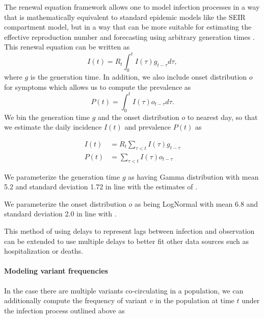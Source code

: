 \documentclass[12pt]{article}
\begin{document}
The renewal equation framework allows one to model infection processes in a way that is mathematically equivalent to standard epidemic models like the SEIR compartment model, but in a way that can be more suitable for estimating the effective reproduction number and forecasting using arbitrary generation times \cite{Champredon2018}. This renewal equation can be written as
\begin{equation}
  I(t) = R_{t} \int_{0}^{t} I(\tau)g_{t-\tau} d\tau,
\end{equation}
where $g$ is the generation time.
In addition, we also include onset distribution $o$ for symptoms which allows us to compute the prevalence as
\begin{equation}
  P(t) = \int_{0}^{t} I(\tau) o_{t-\tau} d \tau.
\end{equation}
We bin the generation time $g$ and the onset distribution $o$ to nearest day, so that we estimate the daily incidence $I(t)$ and prevalence $P(t)$ as

\begin{align}
  I(t) &= R_{t} \sum_{\tau < t} I(\tau) g_{t-\tau}\\
  P(t) &= \sum_{\tau < t} I(\tau) o_{t-\tau}
\end{align}

We parameterize the generation time $g$ as having Gamma distribution with mean 5.2 and standard deviation 1.72 in line with the estimates of \cite{Ganyani2020}.

We parameterize the onset distribution $o$ as being LogNormal with mean 6.8 and standard deviation 2.0 in line with \cite{Cheng2021}.


This method of using delays to represent lags between infection and observation can be extended to use multiple delays to better fit other data sources such as hospitalization or deaths.

\paragraph{Modeling variant frequencies}%

In the case there are multiple variants co-circulating in a population, we can additionally compute the frequency of variant $v$ in the population at time $t$ under the infection process outlined above as
\end{document}

